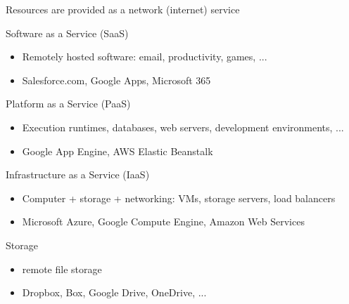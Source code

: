 \begin{slide}

	
	Resources are provided as a network (internet) service
	\medskip
	
	Software as a Service (SaaS)
	\begin{itemize}
		\item Remotely hosted software: email, productivity, games, ...
		\item Salesforce.com, Google Apps, Microsoft 365
	\end{itemize}
	\medskip
	
	Platform as a Service (PaaS)
	\begin{itemize}
		\item Execution runtimes, databases, web servers, development environments, ...
		\item Google App Engine, AWS Elastic Beanstalk
	\end{itemize}
	\medskip
	
	Infrastructure as a Service (IaaS)
	\begin{itemize}
		\item Computer + storage + networking: VMs, storage servers, load balancers
		\item Microsoft Azure, Google Compute Engine, Amazon Web Services
	\end{itemize}
	\medskip
	
	Storage
	\begin{itemize}
		\item remote file storage
		\item Dropbox, Box, Google Drive, OneDrive, ...
	\end{itemize}
	

\end{slide}
    


